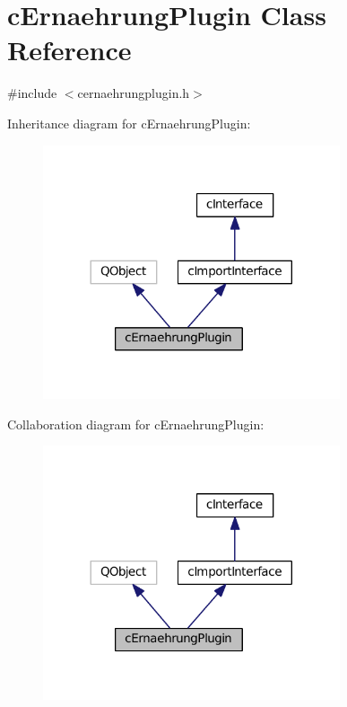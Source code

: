 \hypertarget{classc_ernaehrung_plugin}{}\section{c\+Ernaehrung\+Plugin Class Reference}
\label{classc_ernaehrung_plugin}


{\ttfamily \#include $<$cernaehrungplugin.\+h$>$}



Inheritance diagram for c\+Ernaehrung\+Plugin\+:
\nopagebreak
\begin{figure}[H]
\begin{center}
\leavevmode
\includegraphics[width=248pt]{classc_ernaehrung_plugin__inherit__graph}
\end{center}
\end{figure}


Collaboration diagram for c\+Ernaehrung\+Plugin\+:
\nopagebreak
\begin{figure}[H]
\begin{center}
\leavevmode
\includegraphics[width=248pt]{classc_ernaehrung_plugin__coll__graph}
\end{center}
\end{figure}
